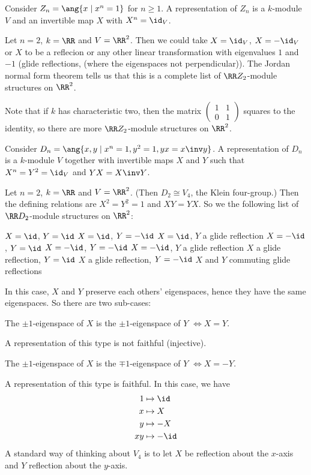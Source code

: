\begin{exam}
	\leavevmode
	\begin{enum}
		\io
		Consider $Z_n = \ang{x \mid x^n=1}$ for $n \geq 1$.
		A representation of $Z_n$ is a $k$-module $V$ and an invertible map $X$ with $X^n=\id_V$.
		
		Let $n=2$, $k=\RR$ and $V=\RR^2$.
		Then we could take $X=\id_V$, $X=-\id_V$ or $X$ to be a reflecion or any other linear transformation with eigenvalues $1$ and $-1$ (glide reflections, (where the eigenspaces not perpendicular)).
		The Jordan normal form theorem tells us that this is a complete list of $\RR Z_2$-module structures on $\RR^2$.
		
		Note that if $k$ has characteristic two, then the matrix
		$\left(\begin{smallmatrix}
		1 & 1 \\ 0 & 1
		\end{smallmatrix}\right)$
		squares to the identity, so there are more $\RR Z_2$-module structures on $\RR^2$.
		
		\io
		Consider $D_n = \ang{x,y \mid x^n=1,y^2=1,yx=x\inv y}$.
		A representation of $D_n$ is a $k$-module $V$ together with invertible maps $X$ and $Y$ such that $X^n=Y^2=\id_V$ and $YX=X\inv Y$.
		
		Let $n=2$, $k=\RR$ and $V=\RR^2$.
		(Then $D_2 \cong V_4$, the Klein four-group.)
		Then the defining relations are $X^2=Y^2=1$ and $XY=YX$.
		So we the following list of $\RR D_2$-module structures on $\RR^2$:
		\begin{enum}
			\io $X=\id$, $Y=\id$
			\io $X=\id$, $Y=-\id$
			\io $X=\id$, $Y$ a glide reflection
			\io $X=-\id$, $Y=\id$
			\io $X=-\id$, $Y=-\id$
			\io\label{item:casef} $X=-\id$, $Y$ a glide reflection
			\io $X$ a glide reflection, $Y=\id$
			\io $X$ a glide reflection, $Y=-\id$
			\io $X$ and $Y$ commuting glide reflections
			\par
			In this case, $X$ and $Y$ preserve each others' eigenspaces, hence they have the same eigenspaces.
			So there are two sub-cases:
			\begin{enum}
				\io\label{item:case2i'}
				The $\pm1$-eigenspace of $X$ is the $\pm1$-eigenspace of $Y$ $\iff X=Y$.
				\par
				A representation of this type is not faithful (injective).
				
				\io\label{item:case2i''}
				The $\pm1$-eigenspace of $X$ is the $\mp1$-eigenspace of $Y$ $\iff X=-Y$.
				\par
				A representation of this type is faithful.
				In this case, we have
				\begin{align*}
					1 &\mapsto \id \\
					x &\mapsto X \\
					y &\mapsto -X \\
					xy &\mapsto -\id
				\end{align*}
				A standard way of thinking about $V_4$ is to let $X$ be reflection about the $x$-axis and $Y$ reflection about the $y$-axis.
				

\end{enum}
\end{enum}
\end{enum}
\end{exam}
